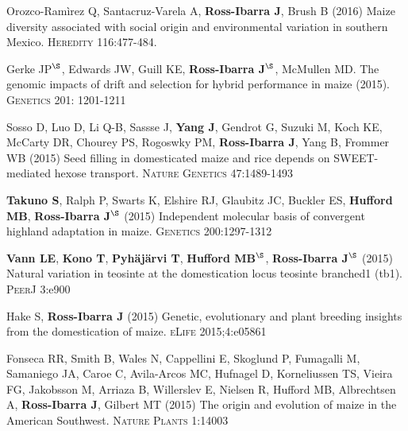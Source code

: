 \begin{etaremune}
\item Orozco-Ram\`{i}rez Q, Santacruz-Varela A, {\bf Ross-Ibarra J}, Brush B (2016) Maize diversity associated with social origin and environmental variation in southern Mexico. \textsc{Heredity} 116:477-484.


\item Gerke JP$^\S$, Edwards JW, Guill KE, {\bf Ross-Ibarra J}$^\S$, McMullen MD.  The genomic impacts of drift and selection for hybrid performance in maize (2015). \textsc{Genetics}  201: 1201-1211


\item Sosso D, Luo D, Li Q-B, Sassse J, {\bf Yang J}, Gendrot G, Suzuki M, Koch KE, McCarty DR, Chourey PS, Rogoswky PM, {\bf Ross-Ibarra J}, Yang B, Frommer WB (2015) Seed filling in domesticated maize and rice depends on SWEET-mediated hexose transport. \textsc{Nature Genetics} 47:1489-1493


\item {\bf Takuno S}, Ralph P, Swarts K, Elshire RJ, Glaubitz JC, Buckler ES, {\bf Hufford MB}, {\bf Ross-Ibarra J}$^\S$ (2015) Independent molecular basis of convergent highland adaptation in maize. \textsc{Genetics} 200:1297-1312


\item {\bf Vann LE}, {\bf Kono T}, {\bf Pyh\"aj\"arvi T}, {\bf Hufford MB}$^\S$, {\bf Ross-Ibarra J}$^\S$ (2015) Natural variation in teosinte at the domestication locus teosinte branched1 (tb1). \textsc{PeerJ} 3:e900


\item Hake S, {\bf Ross-Ibarra J} (2015) Genetic, evolutionary and plant breeding insights from the domestication of maize. \textsc{eLife}  2015;4:e05861


\item Fonseca RR, Smith B, Wales N, Cappellini E, Skoglund P, Fumagalli M, Samaniego JA, Caroe C, Avila-Arcos MC, Hufnagel D, Korneliussen TS, Vieira FG, Jakobsson M, Arriaza B, Willerslev E, Nielsen R, Hufford MB, Albrechtsen A,  {\bf Ross-Ibarra J}, Gilbert MT (2015) The origin and evolution of maize in the American Southwest. \textsc{Nature Plants} 1:14003


\end{etaremune}
